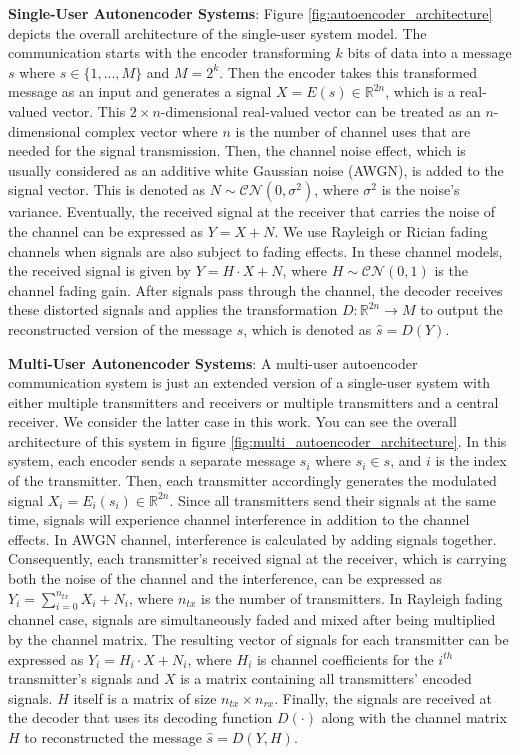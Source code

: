 \textbf{Single-User Autonencoder Systems}: Figure \ref{fig:autoencoder_architecture} depicts the overall architecture of the single-user system model. The communication starts with the encoder transforming \(k\) bits of data into a message \(s\) where \(s \in \{1,...,M\}\) and \(M = 2^k\). Then the encoder takes this transformed message as an input and generates a signal \(X = E(s) \in \mathbb{R}^{2n}\), which is a real-valued vector. This \(2 \times n\)-dimensional real-valued vector can be treated as an \(n\)-dimensional complex vector where \(n\) is the number of channel uses that are needed for the signal transmission. Then, the channel noise effect, which is usually considered as an additive white Gaussian noise (AWGN), is added to the signal vector. This is denoted as \(N \sim \mathcal{CN}(0, \sigma^2)\), where \(\sigma^2\) is the noise's variance. Eventually, the received signal at the receiver that carries the noise of the channel can be expressed as \(Y = X + N\). We use Rayleigh or Rician fading channels when signals are also subject to fading effects. In these channel models, the received signal is given by \(Y = H \cdot X + N\), where \(H \sim \mathcal{CN}(0, 1)\) is the channel fading gain. After signals pass through the channel, the decoder receives these distorted signals and applies the transformation \(D: \mathbb{R}^{2n} \rightarrow M \) to output the reconstructed version of the message \(s\), which is  denoted as \(\hat{s} = D(Y)\).

\textbf{Multi-User Autonencoder Systems}: A multi-user autoencoder communication system is just an extended version of a single-user system with either multiple transmitters and receivers or multiple transmitters and a central receiver. We consider the latter case in this work. You can see the overall architecture of this system in figure \ref{fig:multi_autoencoder_architecture}. In this system, each encoder sends a separate message \(s_i\) where \(s_i \in s\), and \(i\) is the index of the transmitter. Then, each transmitter accordingly generates the modulated signal \(X_i = E_i(s_i) \in \mathbb{R}^{2n}\). Since all transmitters send their signals at the same time, signals will experience channel interference in addition to the channel effects. In AWGN channel, interference is calculated by adding signals together. Consequently, each transmitter's received signal at the receiver, which is carrying both the noise of the channel and the interference, can be expressed as \(Y_i = \sum_{i=0}^{n_{tx}}X_i + N_i\), where \(n_{tx}\) is the number of transmitters. In Rayleigh fading channel case, signals are simultaneously faded and mixed after being multiplied by the channel matrix. The resulting vector of signals for each transmitter can be expressed as \(Y_i = H_i \cdot X + N_i\), where \(H_i\) is channel coefficients for the \(i^{th}\) transmitter's signals and \(X\) is a matrix containing all transmitters' encoded signals. \(H\) itself is a matrix of size \(n_{tx} \times n_{rx}\). Finally, the signals are received at the decoder that uses its decoding function \(D(\cdot)\) along with the channel matrix \(H\) to reconstructed the message \(\hat{s} = D(Y, H)\).

